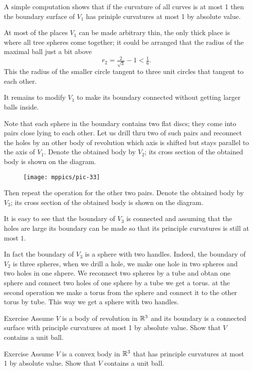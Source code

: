 A simple computation shows that if the curvature of all curves is at most 1 then the boundary surface of $V_1$ has priniple curvatures at most 1 by absolute value.

At most of the places $V_1$ can be made arbitrary thin,
the only thick place is where all tree spheres come together;
it could be arranged that the radius of the maximal ball just a bit above 
\[r_2=\tfrac2{\sqrt{3}}-1< \tfrac16.\]
This the radius of the smaller circle tangent to three unit circles that tangent to each other.


It remains to modify $V_1$ to make its boundary connected without  getting larger balls inside.

Note that each sphere in the boundary contains two flat discs;
they come into pairs close lying to each other. 
Let us drill thru two of such pairs and reconnect the holes by an other body of revolution which axis is shifted but stays parallel to the axis of $V_1$.
Denote the obtained body by $V_2$; its cross section of the obtained body is shown on the diagram. 

\begin{figure}%
\centering
\texttt{[image: mppics/pic-33]}
\vskip0mm
\end{figure}

Then repeat the operation for the other two pairs.
Denote the obtained body by $V_3$; its cross section of the obtained body is shown on the diagram.

It is easy to see that the boundary of $V_3$ is connected
and assuming that the holes are large its boundary can be made so that its principle curvatures is still at most $1$.
\qeds

In fact the boundary of $V_3$ is a sphere with two handles.
Indeed, the boundary of $V_2$ is three spheres,
when we drill a hole, we make one hole in two spheres and two holes in one shpere.
We reconnect two spheres by a tube and obtan one sphere
and connect two holes of one sphere by a tube we get a torus.
at the second operation we make a torus from the sphere and connect it to the other torus by tube.
This way we get a sphere with two handles.

\begin{thm}{Exercise}
Assume $V$ is a body of revolution in $\mathbb{R}^3$ and its boundary is a connected surface with principle curvatures at most 1 by absolute value.
Show that $V$ contains a unit ball.
\end{thm}

\begin{thm}{Exercise}
Assume $V$ is a convex body in $\mathbb{R}^3$ that has principle curvatures at most 1 by absolute value.
Show that $V$ contains a unit ball.
\end{thm}

